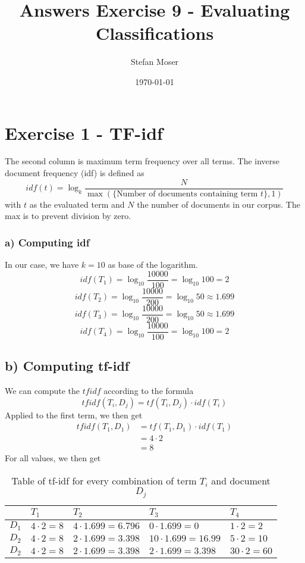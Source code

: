 \documentclass[11pt]{article}
\title{\textbf{Answers Exercise 9 - Evaluating Classifications}}
\author{Stefan Moser}
\date{\today}
\begin{document}
\maketitle

\section*{Exercise 1 - TF-idf}
The second column is maximum term frequency over all terms.
The inverse document frequency (idf) is defined as
\begin{equation}
	idf(t) = \log_k \frac{N}{  \max(\{\text{Number of documents containing term } t \}, 1) }
\end{equation}
with $t$ as the evaluated term and $N$ the number of documents in our corpus. The max is
to prevent division by zero.
\subsubsection*{a) Computing idf}
In our case, we have $k=10$ as base of the logarithm.
\begin{equation}
	idf(T_1) = \log_{10} \frac{10000}{100} = \log_{10} 100 = 2
\end{equation}
\begin{equation}
	idf(T_2) = \log_{10} \frac{10000}{200} = \log_{10} 50 \approx 1.699
\end{equation}
\begin{equation}
	idf(T_3) = \log_{10} \frac{10000}{200} = \log_{10} 50 \approx 1.699
\end{equation}
\begin{equation}
	idf(T_4) = \log_{10} \frac{10000}{100} = \log_{10} 100 = 2
\end{equation}
\subsection*{b) Computing tf-idf}
We can compute the $tfidf$ according to the formula
\begin{equation}
		tfidf(T_i, D_j) = tf(T_i, D_j) \cdot idf(T_i) 
\end{equation}
Applied to the first term, we then get
\begin{align}
	tfidf(T_1, D_1) &= tf(T_1, D_1) \cdot idf(T_1) \\
					&= 4 \cdot 2 \\
					&= 8
\end{align}
For all values, we then get
\begin{table}[h]
\begin{tabular}{|l|l|l|l|l|}
\hline
	\backslashbox{Documents}{Terms} & $T_1$ & $T_2$ & $T_3$ & $T_4$\\
\hline
	$D_1$ & $4 \cdot 2 = 8$ & $4 \cdot 1.699 = 6.796$  & $0 \cdot 1.699 = 0$ & $1 \cdot 2 = 2$\\
\hline
	$D_2$ & $4 \cdot 2 = 8$  & $2 \cdot 1.699 = 3.398$ & $10 \cdot 1.699 = 16.99 $ & $5 \cdot 2 = 10$\\
\hline
	$D_2$ & $4 \cdot 2 = 8$  & $2 \cdot 1.699 = 3.398$ & $2 \cdot 1.699 = 3.398$ & $30 \cdot 2 = 60$\\
\hline
\end{tabular}
\caption{Table of tf-idf for every combination of term $T_i$ and document $D_j$}
\end{table}
\end{document}
